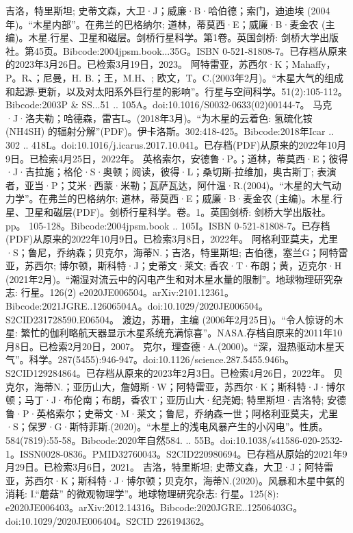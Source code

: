 \begin{enumerate}
 吉洛，特里斯坦; 史蒂文森，大卫·J；威廉·B·哈伯德；索门，迪迪埃 (2004年)。“木星内部”。在弗兰的巴格纳尔; 道林，蒂莫西·E；威廉·B·麦金农 (主编)。木星.行星、卫星和磁层。剑桥行星科学。第1卷。英国剑桥: 剑桥大学出版社。第45页。Bibcode:2004jpsm.book...35G。ISBN 0-521-81808-7。已存档从原来的2023年3月26日。已检索3月19日，2023。
 阿特雷亚，苏西尔·K；Mahaffy，P。R、；尼曼，H. B.；王，M.H、; 欧文，T。C.(2003年2月)。“木星大气的组成和起源-更新，以及对太阳系外巨行星的影响”。行星与空间科学。51(2):105-112。Bibcode:2003P & SS...51 .. 105A。doi:10.1016/S0032-0633(02)00144-7。
 马克·J·洛夫勒；哈德森，雷吉L。(2018年3月)。“为木星的云着色: 氢硫化铵 (NH4SH) 的辐射分解”(PDF)。伊卡洛斯。302:418-425。Bibcode:2018年Icar .. 302 .. 418L。doi:10.1016/j.icarus.2017.10.041。已存档(PDF)从原来的2022年10月9日。已检索4月25日，2022年。
 英格索尔，安德鲁·P。；道林，蒂莫西·E；彼得·J·吉拉施；格伦·S·奥顿；阅读，彼得·L；桑切斯-拉维加，奥古斯丁; 表演者，亚当·P；艾米·西蒙·米勒；瓦萨瓦达，阿什温·R.(2004)。“木星的大气动力学”。在弗兰的巴格纳尔; 道林，蒂莫西·E；威廉·B·麦金农 (主编)。木星.行星、卫星和磁层(PDF)。剑桥行星科学。卷。1。英国剑桥: 剑桥大学出版社。pp。 105-128。Bibcode:2004jpsm.book .. 105I。ISBN  0-521-81808-7。已存档 (PDF)从原来的2022年10月9日。已检索3月8日，2022年。
 阿格利亚莫夫，尤里·S；鲁尼，乔纳森；贝克尔，海蒂N.；吉洛，特里斯坦; 吉伯德，塞兰G；阿特雷亚，苏西尔; 博尔顿，斯科特·J；史蒂文·莱文; 香农·T·布朗；黄，迈克尔·H (2021年2月)。“潮湿对流云中的闪电产生和对木星水量的限制”。地球物理研究杂志: 行星。126(2) e2020JE006504。arXiv:2101.12361。Bibcode:2021JGRE..12606504A。doi:10.1029/2020JE006504。S2CID231728590.E06504。 
 渡边，苏珊，主编 (2006年2月25日)。“令人惊讶的木星: 繁忙的伽利略航天器显示木星系统充满惊喜”。NASA.存档自原来的2011年10月8日。已检索2月20日，2007。
 克尔，理查德·A.(2000)。“深，湿热驱动木星天气”。科学。287(5455):946-947。doi:10.1126/science.287.5455.946b。S2CID129284864。已存档从原来的2023年2月3日。已检索4月26日，2022年。 
 贝克尔，海蒂N.；亚历山大，詹姆斯·W；阿特雷亚，苏西尔·K；斯科特·J·博尔顿；马丁·J·布伦南；布朗，香农T；亚历山大·纪尧姆; 特里斯坦·吉洛特; 安德鲁·P·英格索尔；史蒂文·M·莱文；鲁尼，乔纳森一世；阿格利亚莫夫，尤里·S；保罗·G·斯特菲斯.(2020)。“木星上的浅电风暴产生的小闪电”。性质。584(7819):55-58。Bibcode:2020年自然584. .. 55B。doi:10.1038/s41586-020-2532-1。ISSN0028-0836。PMID32760043。S2CID220980694。已存档从原始的2021年9月29日。已检索3月6日，2021。   
 吉洛，特里斯坦; 史蒂文森，大卫·J；阿特雷亚，苏西尔·K；斯科特·J·博尔顿；贝克尔，海蒂N.(2020)。风暴和木星中氨的消耗: I.“蘑菇” 的微观物理学”。地球物理研究杂志: 行星。125(8): e2020JE006403。arXiv:2012.14316。Bibcode:2020JGRE..12506403G。doi:10.1029/2020JE006404。S2CID 226194362。

\end{enumerate}
